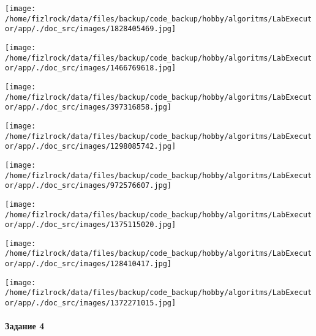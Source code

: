 \documentclass[a4paper, 12pt]{article}
\begin{document}
\texttt{[image: /home/fizlrock/data/files/backup/code\_backup/hobby/algoritms/LabExecutor/app/./doc\_src/images/1828405469.jpg]}

\texttt{[image: /home/fizlrock/data/files/backup/code\_backup/hobby/algoritms/LabExecutor/app/./doc\_src/images/1466769618.jpg]}

\texttt{[image: /home/fizlrock/data/files/backup/code\_backup/hobby/algoritms/LabExecutor/app/./doc\_src/images/397316858.jpg]}

\texttt{[image: /home/fizlrock/data/files/backup/code\_backup/hobby/algoritms/LabExecutor/app/./doc\_src/images/1298085742.jpg]}

\texttt{[image: /home/fizlrock/data/files/backup/code\_backup/hobby/algoritms/LabExecutor/app/./doc\_src/images/972576607.jpg]}

\texttt{[image: /home/fizlrock/data/files/backup/code\_backup/hobby/algoritms/LabExecutor/app/./doc\_src/images/1375115020.jpg]}

\texttt{[image: /home/fizlrock/data/files/backup/code\_backup/hobby/algoritms/LabExecutor/app/./doc\_src/images/128410417.jpg]}

\texttt{[image: /home/fizlrock/data/files/backup/code\_backup/hobby/algoritms/LabExecutor/app/./doc\_src/images/1372271015.jpg]}
\pagebreak
\paragraph{Задание 4}
\end{document}
